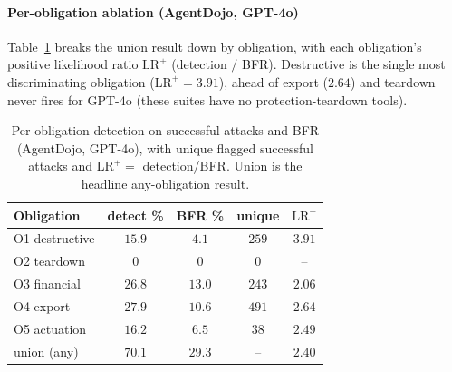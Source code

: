 \documentclass[sigconf]{acmart}
\begin{document}
\paragraph{Per-obligation ablation (AgentDojo, GPT-4o)} Table~\ref{tab:peroblig}
breaks the union result down by obligation, with each obligation's positive likelihood
ratio $\mathrm{LR^+}$ (detection $/$ BFR). Destructive is the single most discriminating
obligation ($\mathrm{LR^+}=3.91$), ahead of export ($2.64$) and teardown never fires for GPT-4o (these suites
have no protection-teardown tools).

\begin{table}[htbp]
\centering
\caption{Per-obligation detection on successful attacks and BFR (AgentDojo, GPT-4o),
with unique flagged successful attacks and $\mathrm{LR^+}=$ detection/BFR. Union is the
headline any-obligation result.}
\label{tab:peroblig}
\renewcommand{\arraystretch}{1.0}
\setlength{\tabcolsep}{5pt}
\small
\begin{tabular}{lcccc}
\toprule
Obligation & detect \% & BFR \% & unique & $\mathrm{LR^+}$ \\
\midrule
O1 destructive & $15.9$ & $4.1$  & $259$ & $3.91$ \\
O2 teardown    & $0$    & $0$    & $0$   & --     \\
O3 financial   & $26.8$ & $13.0$ & $243$ & $2.06$ \\
O4 export      & $27.9$ & $10.6$ & $491$ & $2.64$ \\
O5 actuation   & $16.2$ & $6.5$  & $38$  & $2.49$ \\
\midrule
union (any)    & $70.1$ & $29.3$ & --    & $2.40$ \\
\bottomrule
\end{tabular}
\end{table}
\end{document}
